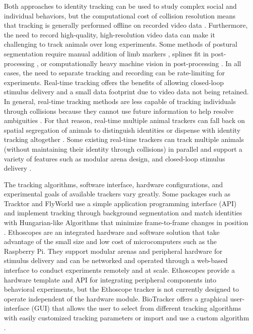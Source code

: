 \documentclass[10pt]{article}
\begin{document}
\begin{multicols}{2}
Both approaches to identity tracking can be used to study complex social and individual behaviors, but the computational cost of collision resolution means that tracking is generally performed offline on recorded video data \citep{Liu_A_2018}. Furthermore, the need to record high-quality, high-resolution video data can make it challenging to track animals over long experiments. Some methods of postural segmentation require manual addition of limb markers \citep{Kain_Leg_2013}, splines fit in post-processing \citep{Uhlmann_FlyLimbTracker_2017}, or computationally heavy machine vision in post-processing \citep{Mathis_DeepLabCut_2018,Pereira_Fast_2018,romero-ferrero_2019}. In all cases, the need to separate tracking and recording can be rate-limiting for experiments. Real-time tracking offers the benefits of allowing closed-loop stimulus delivery and a small data footprint due to video data not being retained. In general, real-time tracking methods are less capable of tracking individuals through collisions because they cannot use future information to help resolve ambiguities \citep{Itskovits_A_2017}. For that reason, real-time multiple animal trackers can fall back on spatial segregation of animals to distinguish identities or dispense with identity tracking altogether \citep{Liu_A_2018,Scaplen_Automated_2019}. Some existing real-time trackers can track multiple animals (without maintaining their identity through collisions) in parallel and support a variety of features such as modular arena design, and closed-loop stimulus delivery \citep{Geissmann_Ethoscopes_2017,Straw_Multi_2010,Stowers_Virtual_2017,Chagas_The_2017}.

The tracking algorithms, software interface, hardware configurations, and experimental goals of available trackers vary greatly. Some packages such as Tracktor and FlyWorld use a simple application programming interface (API) and implement tracking through background segmentation and match identities with Hungarian-like Algorithms that minimize frame-to-frame changes in position \citep{Kuhn_The_1955,Rodriguez_ToxId_2017,Liu_A_2018}. Ethoscopes are an integrated hardware and software solution that take advantage of the small size and low cost of microcomputers such as the Raspberry Pi. They support modular arenas and peripheral hardware for stimulus delivery \citep{Geissmann_Ethoscopes_2017} and can be networked and operated through a web-based interface to conduct experiments remotely and at scale. Ethoscopes provide a hardware template and API for integrating peripheral components into behavioral experiments, but the Ethoscope tracker is not currently designed to operate independent of the hardware module. BioTracker offers a graphical user-interface (GUI) that allows the user to select from different tracking algorithms with easily customized tracking parameters or import and use a custom algorithm \citep{Mnck_BioTracker_2018}. 


\end{multicols}
\end{document}
